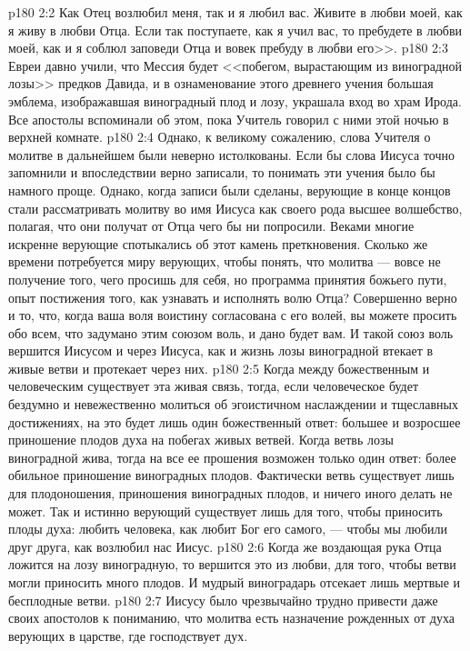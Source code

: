 \vs p180 2:2 Как Отец возлюбил меня, так и я любил вас. Живите в любви моей, как я живу в любви Отца. Если так поступаете, как я учил вас, то пребудете в любви моей, как и я соблюл заповеди Отца и вовек пребуду в любви его>>.
\vs p180 2:3 Евреи давно учили, что Мессия будет <<побегом, вырастающим из виноградной лозы>> предков Давида, и в ознаменование этого древнего учения большая эмблема, изображавшая виноградный плод и лозу, украшала вход во храм Ирода. Все апостолы вспоминали об этом, пока Учитель говорил с ними этой ночью в верхней комнате.
\vs p180 2:4 Однако, к великому сожалению, слова Учителя о молитве в дальнейшем были неверно истолкованы. Если бы слова Иисуса точно запомнили и впоследствии верно записали, то понимать эти учения было бы намного проще. Однако, когда записи были сделаны, верующие в конце концов стали рассматривать молитву во имя Иисуса как своего рода высшее волшебство, полагая, что они получат от Отца чего бы ни попросили. Веками многие искренне верующие спотыкались об этот камень преткновения. Сколько же времени потребуется миру верующих, чтобы понять, что молитва --- вовсе не получение того, чего просишь для себя, но программа принятия божьего пути, опыт постижения того, как узнавать и исполнять волю Отца? Совершенно верно и то, что, когда ваша воля воистину согласована с его волей, вы можете просить обо всем, что задумано этим союзом воль, и дано будет вам. И такой союз воль вершится Иисусом и через Иисуса, как и жизнь лозы виноградной втекает в живые ветви и протекает через них.
\vs p180 2:5 Когда между божественным и человеческим существует эта живая связь, тогда, если человеческое будет бездумно и невежественно молиться об эгоистичном наслаждении и тщеславных достижениях, на это будет лишь один божественный ответ: большее и возросшее приношение плодов духа на побегах живых ветвей. Когда ветвь лозы виноградной жива, тогда на все ее прошения возможен только один ответ: более обильное приношение виноградных плодов. Фактически ветвь существует лишь для плодоношения, приношения виноградных плодов, и ничего иного делать не может. Так и истинно верующий существует лишь для того, чтобы приносить плоды духа: любить человека, как любит Бог его самого, --- чтобы мы любили друг друга, как возлюбил нас Иисус.
\vs p180 2:6 Когда же воздающая рука Отца ложится на лозу виноградную, то вершится это из любви, для того, чтобы ветви могли приносить много плодов. И мудрый виноградарь отсекает лишь мертвые и бесплодные ветви.
\vs p180 2:7 Иисусу было чрезвычайно трудно привести даже своих апостолов к пониманию, что молитва есть назначение рожденных от духа верующих в царстве, где господствует дух.

